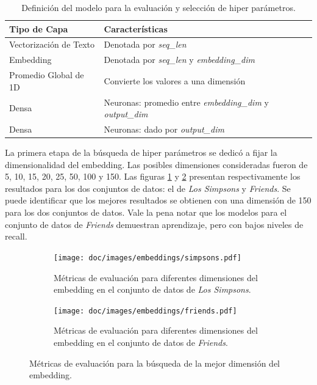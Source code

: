 \begin{table}[h]
    \centering
    \begin{tabular}{|l|l|}
        \hline
        \textbf{Tipo de Capa} & \textbf{Características} \\ \hline
        Vectorización de Texto & Denotada por \textit{seq\_len} \\ \hline
        Embedding & Denotada por \textit{seq\_len} y \textit{embedding\_dim} \\ \hline
        Promedio Global de 1D & Convierte los valores a una dimensión \\ \hline
        Densa & Neuronas: promedio entre \textit{embedding\_dim} y \textit{output\_dim} \\ \hline
        Densa & Neuronas: dado por \textit{output\_dim} \\ \hline
    \end{tabular}
    \caption{Definición del modelo para la evaluación y selección de hiper parámetros.}
    \label{tab:deep_em_hyper_params}
\end{table}

La primera etapa de la búsqueda de hiper parámetros se dedicó a fijar la dimensionalidad del embedding. Las posibles dimensiones consideradas fueron de 5, 10, 15, 20, 25, 50, 100 y 150. Las figuras \ref{fig:em_embedding_simpsons} y \ref{fig:em_embedding_friends} presentan respectivamente los resultados para los dos conjuntos de datos: el de \textit{Los Simpsons} y \textit{Friends}. Se puede identificar que los mejores resultados se obtienen con una dimensión de 150 para los dos conjuntos de datos. Vale la pena notar que los modelos para el conjunto de datos de \textit{Friends} demuestran aprendizaje, pero con bajos niveles de recall. 

\begin{figure}
    \centering
    \begin{subfigure}[b]{0.45\textwidth}
        \centering
        \texttt{[image: doc/images/embeddings/simpsons.pdf]}
        \caption{Métricas de evaluación para diferentes dimensiones del embedding en el conjunto de datos de \textit{Los Simpsons}.}
        \label{fig:em_embedding_simpsons}
    \end{subfigure}
    \hfill
    \begin{subfigure}[b]{0.45\textwidth}
        \centering
        \texttt{[image: doc/images/embeddings/friends.pdf]}
        \caption{Métricas de evaluación para diferentes dimensiones del embedding en el conjunto de datos de \textit{Friends}.}
        \label{fig:em_embedding_friends}
    \end{subfigure}
    \caption{Métricas de evaluación para la búsqueda de la mejor dimensión del embedding.}
    \label{fig:em_embedding}
\end{figure}

